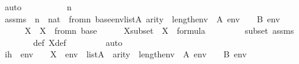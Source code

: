 \begin{isabellebody}
\ auto\isanewline
\ \ \isamarkupfalse%
\ \isanewline
\ \ \ \ \isamarkupfalse%
\ n\ \isanewline
\ \ \ \ \isamarkupfalse%
\ assms{}\ {\isacharcolon}{\kern0pt}\ {\isachardoublequoteopen}n\ {\isasymin}\ nat{\isachardoublequoteclose}\ {\isachardoublequoteopen}{\isasymforall}{\isasymphi}{\isasymin}\ {\isasymDelta}{}{\isacharunderscore}{\kern0pt}from{\isacharcircum}{\kern0pt}n\ {\isacharparenleft}{\kern0pt}{\isasymDelta}{}{\isacharunderscore}{\kern0pt}base{\isacharparenright}{\kern0pt}{\isachardot}{\kern0pt}{\isacharparenleft}{\kern0pt}{\isasymforall}env{\isasymin}list{\isacharparenleft}{\kern0pt}A{\isacharparenright}{\kern0pt}{\isachardot}{\kern0pt}\ arity{\isacharparenleft}{\kern0pt}{\isasymphi}{\isacharparenright}{\kern0pt}\ {\isasymle}\ length{\isacharparenleft}{\kern0pt}env{\isacharparenright}{\kern0pt}\ {\isasymlongrightarrow}\ {\isacharparenleft}{\kern0pt}A{\isacharcomma}{\kern0pt}\ env\ {\isasymTurnstile}\ {\isasymphi}\ {\isasymlongleftrightarrow}\ B{\isacharcomma}{\kern0pt}\ env\ {\isasymTurnstile}\ {\isasymphi}{\isacharparenright}{\kern0pt}{\isacharparenright}{\kern0pt}{\isachardoublequoteclose}\isanewline
\isanewline
\ \ \ \ \isamarkupfalse%
\ X\ \ {\isachardoublequoteopen}X\ {\isasymequiv}\ {\isasymDelta}{}{\isacharunderscore}{\kern0pt}from{\isacharcircum}{\kern0pt}n\ {\isacharparenleft}{\kern0pt}{\isasymDelta}{}{\isacharunderscore}{\kern0pt}base{\isacharparenright}{\kern0pt}{\isachardoublequoteclose}\isanewline
\isanewline
\ \ \ \ \isamarkupfalse%
\ Xsubset\ {\isacharcolon}{\kern0pt}\ {\isachardoublequoteopen}X\ {\isasymsubseteq}\ formula{\isachardoublequoteclose}\ \isanewline
\ \ \ \ \ \ \isamarkupfalse%
\ {\isasymDelta}{}{\isacharunderscore}{\kern0pt}subset\ assms{}\isanewline
\ \ \ \ \ \ \isamarkupfalse%
\ {\isasymDelta}{}{\isacharunderscore}{\kern0pt}def\ X{\isacharunderscore}{\kern0pt}def\ \isanewline
\ \ \ \ \ \ \isamarkupfalse%
\ auto\isanewline
\isanewline
\ \ \ \ \isamarkupfalse%
\ ih{}\ {\isacharcolon}{\kern0pt}\ {\isachardoublequoteopen}{\isasymAnd}env\ {\isasymphi}{\isachardot}{\kern0pt}\ {\isasymphi}\ {\isasymin}\ X\ {\isasymLongrightarrow}\ env\ {\isasymin}\ list{\isacharparenleft}{\kern0pt}A{\isacharparenright}{\kern0pt}\ {\isasymLongrightarrow}\ arity{\isacharparenleft}{\kern0pt}{\isasymphi}{\isacharparenright}{\kern0pt}\ {\isasymle}\ length{\isacharparenleft}{\kern0pt}env{\isacharparenright}{\kern0pt}\ {\isasymLongrightarrow}\ A{\isacharcomma}{\kern0pt}\ env\ {\isasymTurnstile}\ {\isasymphi}\ {\isasymLongrightarrow}\ B{\isacharcomma}{\kern0pt}\ env\ {\isasymTurnstile}\ {\isasymphi}{\isachardoublequoteclose}\ \isamarkupfalse%

\end{isabellebody}
